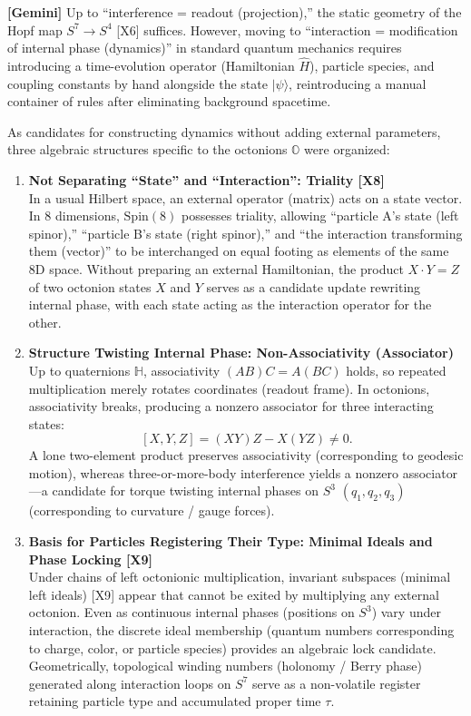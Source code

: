 \documentclass[
  a4paper,
]{article}
\begin{document}
\textbf{{[}Gemini{]}} Up to ``interference = readout (projection),'' the
static geometry of the Hopf map \(S^7 \to S^4\) {[}X6{]} suffices.
However, moving to ``interaction = modification of internal phase
(dynamics)'' in standard quantum mechanics requires introducing a
time-evolution operator (Hamiltonian \(\hat{H}\)), particle species, and
coupling constants by hand alongside the state \(\lvert\psi\rangle\),
reintroducing a manual container of rules after eliminating background
spacetime.

As candidates for constructing dynamics without adding external
parameters, three algebraic structures specific to the octonions
\(\mathbb{O}\) were organized:

\begin{enumerate}
\def\labelenumi{\arabic{enumi}.}
\item
  \textbf{Not Separating ``State'' and ``Interaction'': Triality
  {[}X8{]}}\\
  In a usual Hilbert space, an external operator (matrix) acts on a
  state vector. In 8 dimensions, \(\mathrm{Spin}(8)\) possesses
  triality, allowing ``particle A's state (left spinor),'' ``particle
  B's state (right spinor),'' and ``the interaction transforming them
  (vector)'' to be interchanged on equal footing as elements of the same
  8D space. Without preparing an external Hamiltonian, the product
  \(X \cdot Y = Z\) of two octonion states \(X\) and \(Y\) serves as a
  candidate update rewriting internal phase, with each state acting as
  the interaction operator for the other.
\item
  \textbf{Structure Twisting Internal Phase: Non-Associativity
  (Associator)}\\
  Up to quaternions \(\mathbb{H}\), associativity \((AB)C = A(BC)\)
  holds, so repeated multiplication merely rotates coordinates (readout
  frame). In octonions, associativity breaks, producing a nonzero
  associator for three interacting states:
  \[[X, Y, Z] = (XY)Z - X(YZ) \neq 0.\] A lone two-element product
  preserves associativity (corresponding to geodesic motion), whereas
  three-or-more-body interference yields a nonzero associator---a
  candidate for torque twisting internal phases on \(S^3\)
  \((q_1, q_2, q_3)\) (corresponding to curvature / gauge forces).
\item
  \textbf{Basis for Particles Registering Their Type: Minimal Ideals and
  Phase Locking {[}X9{]}}\\
  Under chains of left octonionic multiplication, invariant subspaces
  (minimal left ideals) {[}X9{]} appear that cannot be exited by
  multiplying any external octonion. Even as continuous internal phases
  (positions on \(S^3\)) vary under interaction, the discrete ideal
  membership (quantum numbers corresponding to charge, color, or
  particle species) provides an algebraic lock candidate. Geometrically,
  topological winding numbers (holonomy / Berry phase) generated along
  interaction loops on \(S^7\) serve as a non-volatile register
  retaining particle type and accumulated proper time \(\tau\).
\end{enumerate}
\end{document}
